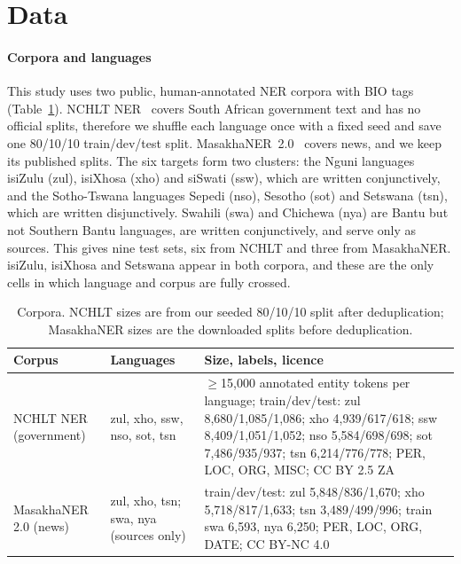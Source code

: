 \section{Data}\label{sec:data}

\paragraph{Corpora and languages} This study uses two public, human-annotated NER corpora with BIO tags (Table~\ref{tab:data}). NCHLT NER~\cite{eiselen2016} covers South African government text and has no official splits, therefore we shuffle each language once with a fixed seed and save one 80/10/10 train/dev/test split. MasakhaNER~2.0~\cite{adelani2022} covers news, and we keep its published splits. The six targets form two clusters: the Nguni languages isiZulu (zul), isiXhosa (xho) and siSwati (ssw), which are written conjunctively, and the Sotho-Tswana languages Sepedi (nso), Sesotho (sot) and Setswana (tsn), which are written disjunctively. Swahili (swa) and Chichewa (nya) are Bantu but not Southern Bantu languages, are written conjunctively, and serve only as sources. This gives nine test sets, six from NCHLT and three from MasakhaNER. isiZulu, isiXhosa and Setswana appear in both corpora, and these are the only cells in which language and corpus are fully crossed.

\begin{table}[t]
\centering\footnotesize
\caption{Corpora. NCHLT sizes are from our seeded 80/10/10 split after deduplication; MasakhaNER sizes are the downloaded splits before deduplication.}
\label{tab:data}
\begin{tabular}{@{}>{\raggedright}p{1.8cm}>{\raggedright}p{1.85cm}>{\raggedright\arraybackslash}p{4.15cm}@{}}
\toprule
Corpus & Languages & Size, labels, licence\\
\midrule
NCHLT NER (government) & zul, xho, ssw, nso, sot, tsn & $\geq$15,000 annotated entity tokens per language; train/dev/test: zul 8,680/1,085/1,086; xho 4,939/617/618; ssw 8,409/1,051/1,052; nso 5,584/698/698; sot 7,486/935/937; tsn 6,214/776/778; PER, LOC, ORG, MISC; CC BY 2.5 ZA\\
\addlinespace
MasakhaNER 2.0 (news) & zul, xho, tsn; swa, nya (sources only) & train/dev/test: zul 5,848/836/1,670; xho 5,718/817/1,633; tsn 3,489/499/996; train swa 6,593, nya 6,250; PER, LOC, ORG, DATE; CC BY-NC 4.0\\
\bottomrule
\end{tabular}
\end{table}

